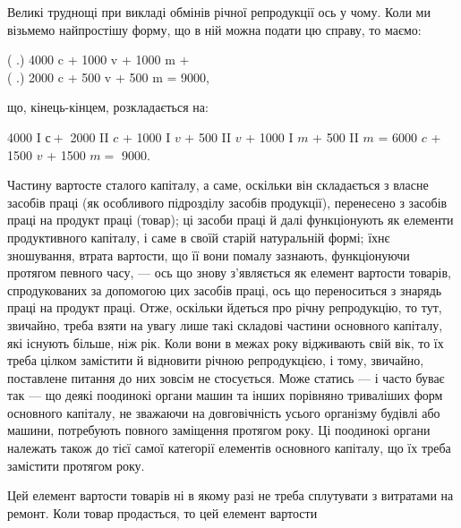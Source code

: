 Великі труднощі при викладі обмінів річної репродукції ось у чому.
Коли ми візьмемо найпростішу форму, що в ній можна подати цю
справу, то маємо:
\begin{center}

  ( .) 4000 c + 1000 v + 1000 m +\\

  ( .) 2000 c + 500 v + 500 m = 9000,

\end{center}
що, кінець-кінцем, розкладається на:
\begin{center}
  4000 I $с +$ 2000 II $c$ + 1000 I $v$ + 500 II $v$ + 1000 I $m$ + 500 II $m$ =
  6000 $c$ + 1500 $v$ + 1500 $m =$ 9000.
\end{center}
Частину вартосте сталого капіталу, а саме, оскільки він складається
з власне засобів праці (як особливого підрозділу засобів продукції),
перенесено з засобів праці на продукт праці (товар); ці засоби праці
й далі функціонують як елементи продуктивного капіталу, і саме в своїй
старій натуральній формі; їхнє зношування, втрата вартости, що її вони
помалу зазнають, функціонуючи протягом певного часу, — ось що знову
з’являється як елемент вартости товарів, спродукованих за допомогою цих
засобів праці, ось що переноситься з знарядь праці на продукт праці. Отже,
оскільки йдеться про річну репродукцію, то тут, звичайно, треба взяти
на увагу лише такі складові частини основного капіталу, які існують
більше, ніж рік. Коли вони в межах року відживають свій вік, то їх
треба цілком замістити й відновити річною репродукцією, і тому, звичайно,
поставлене питання до них зовсім не стосується. Може статись —
і часто буває так — що деякі поодинокі органи машин та інших порівняно
триваліших форм основного капіталу, не зважаючи на довговічність
усього організму будівлі або машини, потребують повного заміщення
протягом року. Ці поодинокі органи належать також до тієї самої категорії
елементів основного капіталу, що їх треба замістити протягом року.

Цей елемент вартости товарів ні в якому разі не треба сплутувати з
витратами на ремонт. Коли товар продасться, то цей елемент вартости

\parbreak{}  %
